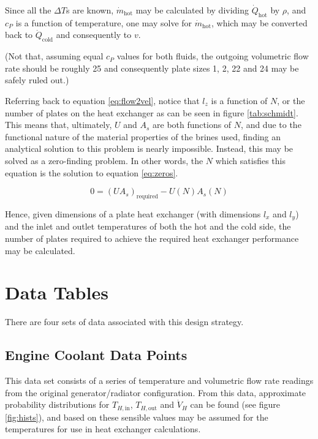 \documentclass[12pt,letterpaper]{article}
\begin{document}
Since all the \(\Delta T\)s are known, \(\dot{m}_{\textrm{hot}}\) may be calculated by dividing \(\dot{Q}_{\textrm{hot}}\) by \(\rho\), and \(c_P\) is a function of temperature, one may solve for \(\dot{m}_{\textrm{hot}}\), which may be converted back to \(\dot{Q}_{\textrm{cold}}\) and consequently to \(v\).

(Not that, assuming equal \(c_P\) values for both fluids, the outgoing volumetric flow rate should be roughly 25 and consequently plate sizes 1, 2, 22 and 24 may be safely ruled out.)

Referring back to equation \ref{eq:flow2vel}, notice that \(l_z\) is a function of \(N\), or the number of plates on the heat exchanger as can be seen in figure \ref{tab:schmidt}. This means that, ultimately, \(U\) and \(A_s\) are both functions of \(N\), and due to the functional nature of the material properties of the brines used, finding an analytical solution to this problem is nearly impossible.  Instead, this may be solved as a zero-finding problem. In other words, the \(N\) which satisfies this equation is the solution to equation \ref{eq:zeros}.

\begin{equation}
\label{eq:zeros}
0 = (UA_s)_{\textrm{required}} - U(N) A_s(N)
\end{equation}

Hence, given dimensions of a plate heat exchanger (with dimensions \(l_x\) and \(l_y\)) and the inlet and outlet temperatures of both the hot and the cold side, the number of plates required to achieve the required heat exchanger performance may be calculated.

\section{Data Tables}

There are four sets of data associated with this design strategy.

\subsection{Engine Coolant Data Points}

This data set consists of a series of temperature and volumetric flow rate readings from the original generator/radiator configuration. From this data, approximate probability distributions for \(T_{H, \textrm{in}}\), \(T_{H, \textrm{out}}\) and \(\dot{V}_H\) can be found (see figure \ref{fig:hists}), and based on these sensible values may be assumed for the temperatures for use in heat exchanger calculations.
\end{document}
